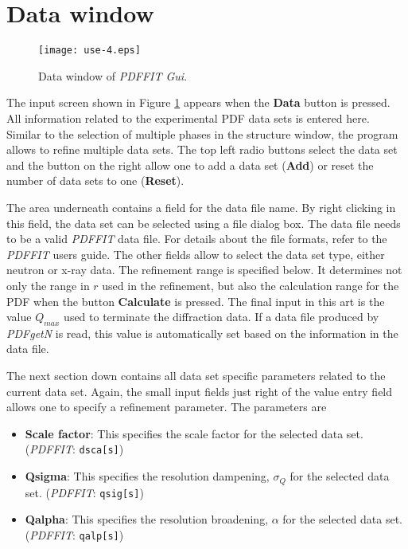 \section{Data window}

\begin{figure}[!t]
   \centering
   \texttt{[image: use-4.eps]}
   \caption{Data window of {\it PDFFIT Gui}.}
   \label{fig_use4}
\end{figure}

The input screen shown in Figure \ref{fig_use4} appears when the
{\bf Data} button is pressed. All information related to the
experimental PDF data sets is entered here. Similar to the selection
of multiple phases in the structure window, the program allows to
refine multiple data sets. The top left radio buttons select the
data set and the button on the right allow one to add a data set
({\bf Add}) or reset the number of data sets to one ({\bf Reset}).
\par

The area underneath contains a field for the data file name. By
right clicking in this field, the data set can be selected using a
file dialog box. The data file needs to be a valid {\it PDFFIT} data
file. For details about the file formats, refer to the {\it PDFFIT}
users guide. The other fields allow to select the data set type,
either neutron or x-ray data. The refinement range is specified
below. It determines not only the range in $r$ used in the
refinement, but also the calculation range for the PDF when the
button {\bf Calculate} is pressed. The final input in this art is
the value $Q_{max}$ used to terminate the diffraction data. If a
data file produced by {\it PDFgetN} is read, this value is
automatically set based on the information in the data file. \par

The next section down contains all data set specific parameters
related to the current data set. Again, the small input fields just
right of the value entry field allows one to specify a refinement
parameter. The parameters are

\begin{itemize}
  \item \textbf{Scale factor}: This specifies the scale factor for the
  selected data set. ({\it PDFFIT}: {\tt dsca[s]})

  \item \textbf{Qsigma}: This specifies the resolution dampening, $\sigma_Q$
  for the selected data set. ({\it PDFFIT}: {\tt qsig[s]})

  \item \textbf{Qalpha}: This specifies the resolution broadening, $\alpha$
  for the selected data set. ({\it PDFFIT}: {\tt qalp[s]})
\end{itemize}

